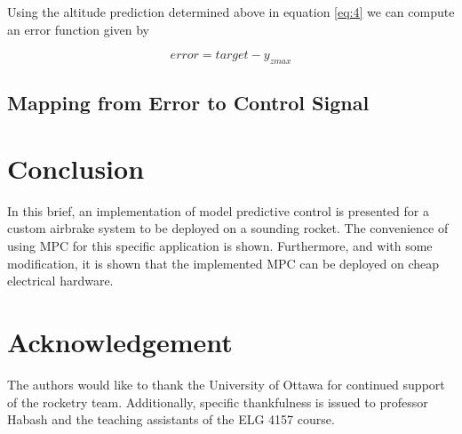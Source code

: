 \documentclass[conference, letterpaper]{IEEEtran}
\begin{document}
Using the altitude prediction determined above in equation \ref{eq:4} we can compute an error function given by

\begin{equation} \label{eq:4}
  error =  target - y_{z max}
\end{equation}


\subsection{Mapping from Error to Control Signal}

\section{Conclusion}

In this brief, an implementation of model predictive control is presented for a
custom airbrake system to be deployed on a sounding rocket. The convenience of
using MPC for this specific application is shown. Furthermore, and with some
modification, it is shown that the implemented MPC can be deployed on cheap electrical
hardware.

\section{Acknowledgement}

The authors would like to thank the University of Ottawa for continued support of the
rocketry team. Additionally, specific thankfulness is issued to professor Habash and
the teaching assistants of the ELG 4157 course.



\end{document}
